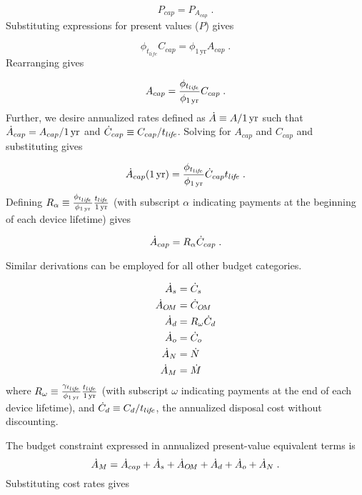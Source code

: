 \begin{equation}
  P_{cap} = P_{A_{cap}} \; .
\end{equation}
%
Substituting expressions for present values ($P$) gives

\begin{equation}
  \phi_{t_{life}} C_{cap} = \phi_{1\,\mathrm{yr}} A_{cap} \; .
\end{equation}
%
Rearranging gives

\begin{equation}
  A_{cap} = \frac{\phi_{t_{li\!f\!e}}}{\phi_{1\,\mathrm{yr}}} C_{cap} \; .
\end{equation}
%
Further, we desire annualized rates defined as
$\dot{A} \equiv A/1\,\mathrm{yr}$ such that
$\dot{A}_{cap} = A_{cap}/1\,\mathrm{yr}$
and 
$\dot{C}_{cap} \equiv C_{cap}/t_{li\!f\!e}$.
Solving for $A_{cap}$ and $C_{cap}$ and substituting gives

\begin{equation}
  \dot{A}_{cap} (1\,\mathrm{yr}) = \frac{\phi_{t_{li\!f\!e}}}{\phi_{1\,\mathrm{yr}}} \dot{C}_{cap} t_{li\!f\!e} \; .
\end{equation}
%
Defining $R_\alpha \equiv \frac{\phi_{t_{li\!f\!e}}}{\phi_{1\,\mathrm{yr}}} \frac{t_{li\!f\!e}}{1\,\mathrm{yr}}$ 
(with subscript $\alpha$ indicating payments at the beginning of each 
device lifetime) gives

\begin{equation}
  \dot{A}_{cap} = R_\alpha \dot{C}_{cap} \; .
\end{equation}

Similar derivations can be employed for all other budget categories.

\begin{align}
  \dot{A}_s &= \dot{C}_s \\
  \dot{A}_{O\!M} &= \dot{C}_{O\!M} \\
  \dot{A}_d &= R_\omega \dot{C}_d \\
  \dot{A}_o &= \dot{C}_o \\
  \dot{A}_N &= \dot{N} \\
  \dot{A}_M &= \dot{M}
\end{align}
%
where 
$R_\omega \equiv \frac{\gamma_{t_{li\!f\!e}}}{\phi_{1\,\mathrm{yr}}} \frac{t_{li\!f\!e}}{1\,\mathrm{yr}}$
(with subscript $\omega$ indicating payments 
at the end of each device lifetime), and 
$\dot{C}_d \equiv C_d / t_{li\!f\!e}$, the annualized disposal cost 
without discounting.

The budget constraint expressed in annualized present-value equivalent terms is 
%
\begin{equation}
  \dot{A}_M = \dot{A}_{cap} + 
               \dot{A}_s + 
               \dot{A}_{O\!M} + 
               \dot{A}_d + 
               \dot{A}_o + 
               \dot{A}_N \; .
\end{equation}
%
Substituting cost rates gives

